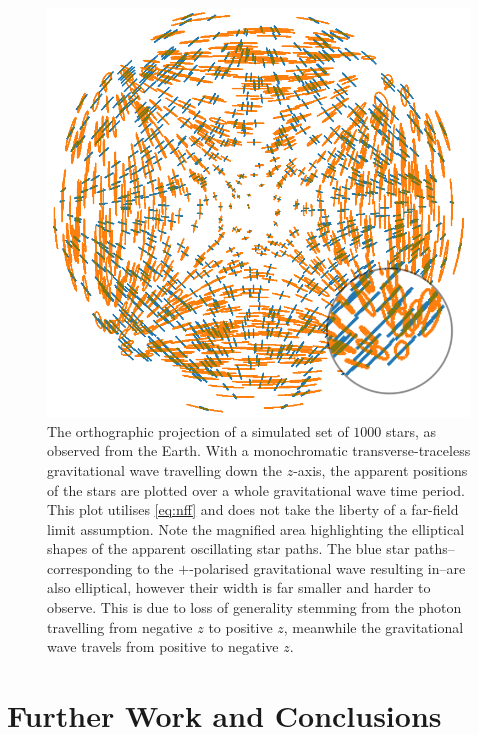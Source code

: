 \begin{figure} 
\centering    
\includegraphics[width=1.0\textwidth]{Chapter4/Figs/Raster/fullstar.png}
\caption{\label{fig:ccc} The orthographic projection of a simulated set of $1000$ stars, as observed from the Earth. With a monochromatic transverse-traceless gravitational wave travelling down the $z$-axis, the apparent positions of the stars are plotted over a whole gravitational wave time period. This plot utilises \cref{eq:nff} and does not take the liberty of a far-field limit assumption. Note the magnified area highlighting the elliptical shapes of the apparent oscillating star paths. The blue star paths--corresponding to the $+$-polarised gravitational wave resulting in--are also elliptical, however their width is far smaller and harder to observe. This is due to loss of generality stemming from the photon travelling from negative $z$ to positive $z$, meanwhile the gravitational wave travels from positive to negative $z$.}
\end{figure}



\section{Further Work and Conclusions}



